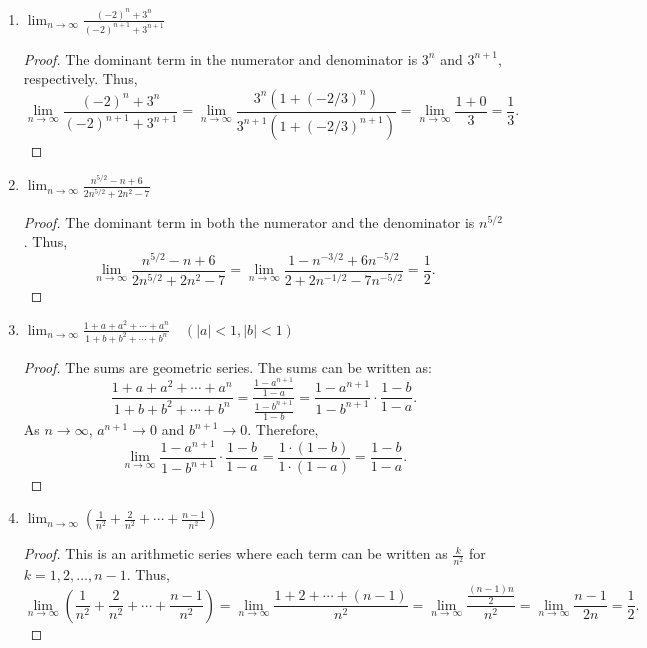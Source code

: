 \begin{solution}
\begin{enumerate}
    \item $\lim_{n \to \infty} \frac{(-2)^n + 3^n}{(-2)^{n+1} + 3^{n+1}}$
    \begin{proof}
    The dominant term in the numerator and denominator is $3^n$ and $3^{n+1}$, respectively. Thus,
    \[
    \lim_{n \to \infty} \frac{(-2)^n + 3^n}{(-2)^{n+1} + 3^{n+1}} = \lim_{n \to \infty} \frac{3^n(1 + (-2/3)^n)}{3^{n+1}(1 + (-2/3)^{n+1})} = \lim_{n \to \infty} \frac{1 + 0}{3} = \frac{1}{3}.
    \]
    \end{proof}
    
    \item $\lim_{n \to \infty} \frac{n^{5/2} - n + 6}{2n^{5/2} + 2n^2 - 7}$
    \begin{proof}
    The dominant term in both the numerator and the denominator is $n^{5/2}$. Thus,
    \[
    \lim_{n \to \infty} \frac{n^{5/2} - n + 6}{2n^{5/2} + 2n^2 - 7} = \lim_{n \to \infty} \frac{1 - n^{-3/2} + 6n^{-5/2}}{2 + 2n^{-1/2} - 7n^{-5/2}} = \frac{1}{2}.
    \]
    \end{proof}

    \item $\lim_{n \to \infty} \frac{1 + a + a^2 + \cdots + a^n}{1 + b + b^2 + \cdots + b^n} \quad (|a|<1, |b|<1)$
    \begin{proof}
    The sums are geometric series. The sums can be written as:
    \[
    \frac{1 + a + a^2 + \cdots + a^n}{1 + b + b^2 + \cdots + b^n} = \frac{\frac{1-a^{n+1}}{1-a}}{\frac{1-b^{n+1}}{1-b}} = \frac{1-a^{n+1}}{1-b^{n+1}} \cdot \frac{1-b}{1-a}.
    \]
    As $n \to \infty$, $a^{n+1} \to 0$ and $b^{n+1} \to 0$. Therefore,
    \[
    \lim_{n \to \infty} \frac{1-a^{n+1}}{1-b^{n+1}} \cdot \frac{1-b}{1-a} = \frac{1 \cdot (1-b)}{1 \cdot (1-a)} = \frac{1-b}{1-a}.
    \]
    \end{proof}

    \item $\lim_{n \to \infty} \left( \frac{1}{n^2} + \frac{2}{n^2} + \cdots + \frac{n-1}{n^2} \right)$
    \begin{proof}
    This is an arithmetic series where each term can be written as $\frac{k}{n^2}$ for $k = 1, 2, \ldots, n-1$. Thus,
    \[
    \lim_{n \to \infty} \left( \frac{1}{n^2} + \frac{2}{n^2} + \cdots + \frac{n-1}{n^2} \right) = \lim_{n \to \infty} \frac{1 + 2 + \cdots + (n-1)}{n^2} = \lim_{n \to \infty} \frac{\frac{(n-1)n}{2}}{n^2} = \lim_{n \to \infty} \frac{n-1}{2n} = \frac{1}{2}.
    \]
    \end{proof}


\end{enumerate}
\end{solution}
